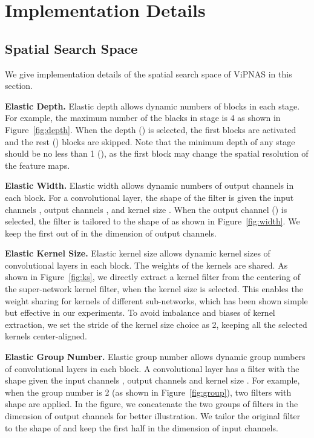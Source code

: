 \documentclass[final]{cvpr}
\begin{document}
\section{Implementation Details}
\label{sec:supp_implementation}
\subsection{Spatial Search Space}
\label{sec:supp_spatial_search_space}
We give implementation details of the spatial search space of ViPNAS in this section.

\textbf{Elastic Depth.} 
Elastic depth allows dynamic numbers of blocks in each stage. For example, the maximum number of the blacks in stage  is 4 as shown in Figure~\ref{fig:depth}. When the depth  () is selected, the first  blocks are activated and the rest () blocks are skipped. Note that the minimum depth of any stage should be no less than 1 (), as the first block may change the spatial resolution of the feature maps.


\textbf{Elastic Width.}
Elastic width allows dynamic numbers of output channels in each block. For a convolutional layer, the shape of the filter is  given the input channels , output channels , and kernel size . When the output channel  () is selected, the filter is tailored to the shape of  as shown in Figure~\ref{fig:width}. We keep the first  out of  in the dimension of output channels.



\textbf{Elastic Kernel Size.}
Elastic kernel size allows dynamic kernel sizes of convolutional layers in each block. The weights of the kernels are shared. As shown in Figure~\ref{fig:ks}, we directly extract a  kernel filter from the centering of the super-network kernel filter, when the kernel size  is selected. This enables the weight sharing for kernels of different sub-networks, which has been shown simple but effective in our experiments. To avoid imbalance and biases of kernel extraction, we set the stride of the kernel size choice as 2, keeping all the selected kernels center-aligned.


\textbf{Elastic Group Number.}
Elastic group number allows dynamic group numbers of convolutional layers in each block. A convolutional layer has a filter with the shape  given the input channels , output channels  and kernel size . For example, when the group number is 2 (as shown in Figure~\ref{fig:group}), two filters with shape  are applied. In the figure, we concatenate the two groups of filters in the dimension of output channels for better illustration. We tailor the original filter to the shape of  and keep the first half in the dimension of input channels.
\end{document}

